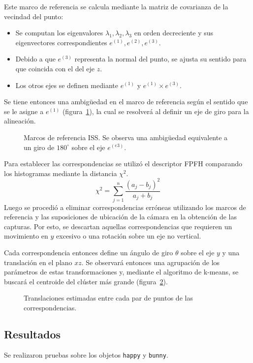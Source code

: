 		Este marco de referencia se calcula mediante la matriz de covarianza de la vecindad del punto:
		\begin{itemize}
			\item Se computan los eigenvalores ${\lambda_1, \lambda_2, \lambda_3}$ en orden decreciente y sus eigenvectores correspondientes
				$e^{(1)}, e^{(2)}, e^{(3)}$.
			\item Debido a que $e^{(3)}$ representa la normal del punto, se ajusta su sentido para que coincida con el del eje $z$.
			\item Los otros ejes se definen mediante $e^{(1)}$ y $e^{(1)} \times e^{(3)}$.
		\end{itemize}
		Se tiene entonces una ambigüedad en el marco de referencia según el sentido que se le asigne a $e^{(1)}$ (figura~\ref{fig:marco_referencia_iss}),
		la cual se resolverá al definir un eje de giro para la alineación.

		\begin{figure}
			\caption{\label{fig:marco_referencia_iss}Marcos de referencia ISS. Se observa una ambigüedad equivalente a un giro de $180^{\circ}$ sobre el eje $e^{(e3)}$.}
		\end{figure}

		Para establecer las correspondencias se utilizó el descriptor FPFH
		comparando los histogramas mediante la distancia $\chi^2$.
		\[ \chi^2 = \sum_{j=1}^{n} \frac{\left(a_j - b_j\right)^2}{a_j + b_j} \]
		Luego se
		procedió a eliminar correspondencias erróneas utilizando los marcos de
		referencia y las suposiciones de ubicación de la cámara en la obtención
		de las capturas.  Por esto, se descartan aquellas correspondencias que
		requieren un movimiento en $y$ excesivo o una rotación sobre un eje no
		vertical. 

		Cada correspondencia entonces define un ángulo de giro $\theta$ sobre
		el eje $y$ y una translación en el plano $xz$.  Se observará entonces
		una agrupación de los parámetros de estas transformaciones y, mediante el
		algoritmo de k-means, se buscará el centroide del clúster más grande (figura~\ref{fig:cluster}).
		\begin{figure}
			\resizebox{.9\linewidth}{!}{}
			\caption{\label{fig:cluster}Translaciones estimadas entre cada par
			de puntos de las correspondencias.}
		\end{figure}

		\subsection{Resultados}
			Se realizaron pruebas sobre los objetos \texttt{happy} y \texttt{bunny}.


